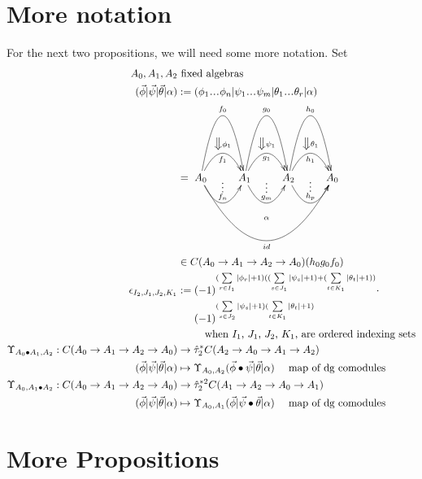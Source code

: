 \section{More notation}
For the next two propositions, we will need 
some more notation. Set
\begin{align*}
A_0, A_1, A_2
&\textrm{ fixed algebras}\\
(\vec{\phi} | \vec{\psi} | \vec{\theta}| \alpha) 
&:= 
(\phi_1\smdots\phi_n | \psi_1\smdots\psi_m| 
  \theta_1 \smdots \theta_r|\alpha)\\
&= 
\xymatrix{
A_0 \ar@/^5pc/[r]^{f_0} 
\ar@/^2pc/[r]^{\big\Downarrow \phi_1}_{f_1} 
\ar@/_2pc/[r]^{\substack{\vdots\\ f_n}}
\ar@/_5pc/[rrr]_{id}^{\substack{\alpha \\ \\ \\ \\ }}
& A_1 \ar@/^5pc/[r]^{g_0} 
\ar@/^2pc/[r]^{\big\Downarrow \psi_1}_{g_1} 
\ar@/_2pc/[r]^{\substack{\vdots\\ g_m}}
& A_2 \ar@/^5pc/[r]^{h_0} 
\ar@/^2pc/[r]^{\big\Downarrow \theta_1}_{h_1} 
\ar@/_2pc/[r]^{\substack{\vdots\\ h_p}}
& A_0
}\\
&\in 
C(A_0 \to A_1 \to A_2 \to A_0)(h_0g_0f_0)\\
\epsilon_{I_2,J_1,J_2,K_1} 
&:= 
(-1)^{(\sum \limits_{r \in I_1}|\phi_r|+1)
  ((\sum \limits_{s \in J_1}|\psi_s|+1) + 
  (\sum \limits_{t \in K_1}|\theta_t|+1))}\cdot\\
&\phantom{{}:={}} 
  (-1)^{(\sum \limits_{s \in J_2}|\psi_s|+1)
  (\sum \limits_{t \in K_1}|\theta_t|+1)}\\
&\phantom{{}:={}}  
  \quad \textrm{when $I_1$, $J_1$, $J_2$, $K_1$, 
  are ordered indexing sets}\\  
\Upsilon_{A_0\bullet A_1, A_2}:
  C(A_0 \to A_1 \to A_2 \to A_0) 
&\to
\hat{\tau}_2^*C(A_2 \to A_0 \to A_1 \to A_2)\\
(\vec{\phi} | \vec{\psi} | \vec{\theta}| \alpha) 
&\mapsto 
\Upsilon_{A_0,A_2}
  (\vec{\phi} \bullet \vec{\psi} | \vec{\theta}| \alpha)
  \quad \textrm{ map of dg comodules}\\
\Upsilon_{A_0,A_1\bullet A_2}:
  C(A_0 \to A_1 \to A_2 \to A_0) 
&\to
\hat{\tau}_2^{*2}C(A_1 \to A_2 \to A_0 \to A_1)\\
(\vec{\phi} | \vec{\psi} | \vec{\theta}| \alpha) 
&\mapsto 
\Upsilon_{A_0,A_1}
  (\vec{\phi}|\vec{\psi} \bullet \vec{\theta}| \alpha)
  \quad \textrm{ map of dg comodules}\\
\end{align*}

\section{More Propositions}

